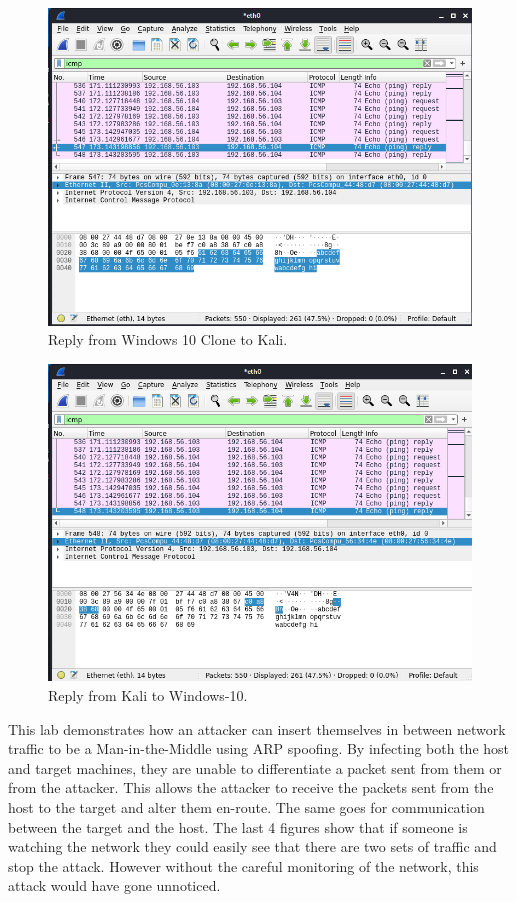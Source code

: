 \begin{figure}[H]
    \centering
    \includegraphics[width=\linewidth]{figures/reply1.png}
    \caption{Reply from Windows 10 Clone to Kali.}
    \label{fig:reply1}
\end{figure}
\begin{figure}[H]
    \centering
    \includegraphics[width=\linewidth]{figures/reply2.png}
    \caption{Reply from Kali to Windows-10.}
    \label{fig:reply2}
\end{figure}

This lab demonstrates how an attacker can insert themselves in between network traffic to be a Man-in-the-Middle using ARP spoofing.
By infecting both the host and target machines, they are unable to differentiate a packet sent from them or from the attacker.
This allows the attacker to receive the packets sent from the host to the target and alter them en-route.
The same goes for communication between the target and the host.
The last 4 figures show that if someone is watching the network they could easily see that there are two sets of traffic and stop the attack.
However without the careful monitoring of the network, this attack would have gone unnoticed.